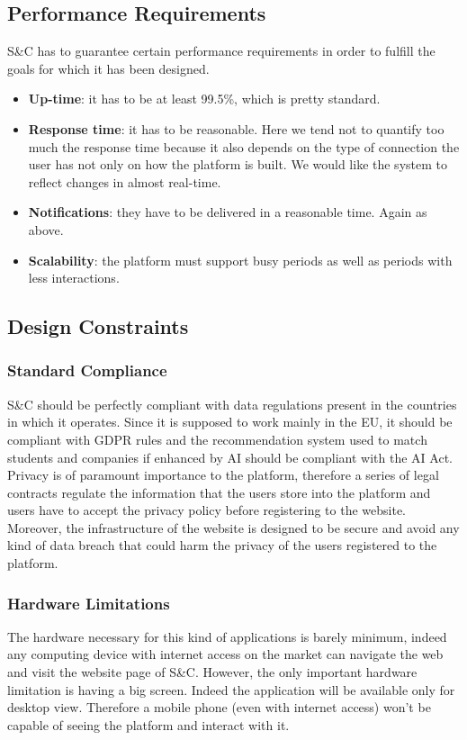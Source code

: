 \begin{enumerate}[label={[G\arabic*]}]
\begin{longtable}{|p{8cm}|p{8cm}|}
\end{longtable}
\end{enumerate}
\subsection{Performance Requirements}
S\&C has to guarantee certain performance requirements in order to fulfill the goals for which it has been designed. 
\begin{itemize}
    \item \textbf{Up-time}: it has to be at least 99.5\%, which is pretty standard.
    \item \textbf{Response time}: it has to be reasonable. Here we tend not to quantify too much the response time because it also depends on the type of connection the user has not only on how the platform is built. We would like the system to reflect changes in almost real-time.
    \item \textbf{Notifications}: they have to be delivered in a reasonable time. Again as above.
    \item \textbf{Scalability}: the platform must support busy periods as well as periods with less interactions.
\end{itemize}


\subsection{Design Constraints}
\subsubsection{Standard Compliance}
S\&C should be perfectly compliant with data regulations present in the countries in which it operates. Since it is supposed to work mainly in the EU, it should be compliant with GDPR rules and the recommendation system used to match students and companies if enhanced by AI should be compliant with the AI Act. Privacy is of paramount importance to the platform, therefore a series of legal contracts regulate the information that the users store into the platform and users have to accept the privacy policy before registering to the website. Moreover, the infrastructure of the website is designed to be secure and avoid any kind of data breach that could harm the privacy of the users registered to the platform.

\subsubsection{Hardware Limitations}
The hardware necessary for this kind of applications is barely minimum, indeed any computing device with internet access on the market can navigate the web and visit the website page of S\&C. However, the only important hardware limitation is having a big screen. Indeed the application will be available only for desktop view. Therefore a mobile phone (even with internet access) won't be capable of seeing the platform and interact with it.

